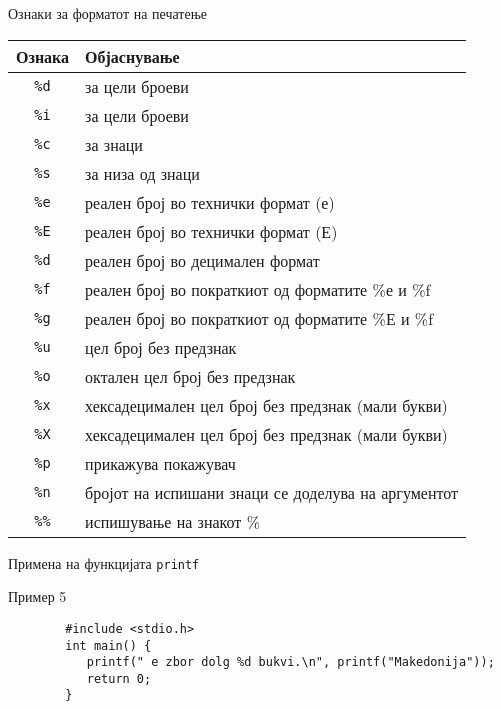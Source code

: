 \begin{frame}{Ознаки за форматот на печатење}
\begin{scriptsize}
\begin{tabular}{|c|l|}
\hline \textbf{Ознака} & \textbf{Објаснување} \\ 
\hline \texttt{\%d} & за цели броеви \\ 
\hline \texttt{\%i} & за цели броеви \\ 
\hline \texttt{\%c} & за знаци \\ 
\hline \texttt{\%s} & за низа од знаци \\ 
\hline \texttt{\%e} & реален број во технички формат (е) \\ 
\hline \texttt{\%E} & реален број во технички формат (Е) \\ 
\hline \texttt{\%d} & реален број во децимален формат \\ 
\hline \texttt{\%f} & реален број во пократкиот од форматите \%е и \%f \\ 
\hline \texttt{\%g} & реален број во пократкиот од форматите \%Е и \%f \\  
\hline \texttt{\%u} & цел број без предзнак \\ 
\hline \texttt{\%o} & октален цел број без предзнак \\ 
\hline \texttt{\%x} & хексадецимален цел број без предзнак (мали букви) \\ 
\hline \texttt{\%X} & хексадецимален цел број без предзнак (мали букви) \\ 
\hline \texttt{\%p} & прикажува покажувач \\ 
\hline \texttt{\%n} & бројот на испишани знаци се доделува на аргументот \\ 
\hline \texttt{\%\%} & испишување на знакот \% \\ 
\hline 
\end{tabular} 
\end{scriptsize}
\end{frame}

\begin{frame}[fragile]{Примена на функцијата \texttt{printf}}
	\begin{exampleblock}{Пример 5}
		\begin{lstlisting}
		#include <stdio.h>
		int main() {
		   printf(" e zbor dolg %d bukvi.\n", printf("Makedonija"));
		   return 0;
		}
		\end{lstlisting}
	\end{exampleblock}
\end{frame}

